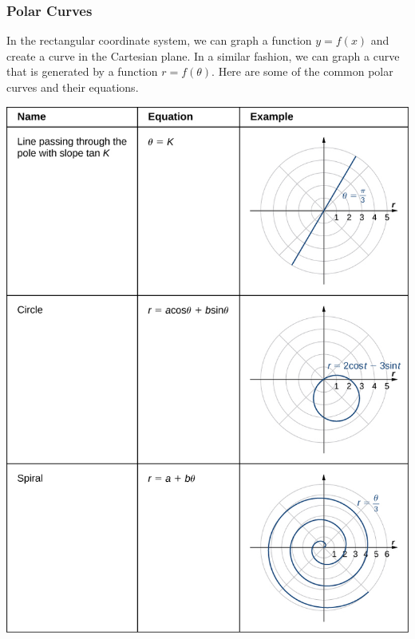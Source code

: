 \documentclass[12pt,addpoints]{exam}
\begin{document}
	\subsubsection*{Polar Curves}
	In the rectangular coordinate system, we can graph a function $y=f(x)$ and create a curve in the Cartesian plane. In a similar fashion, we can graph a curve that is generated by a function  $r=f(\theta)$. Here are some of the common polar curves and their equations.
	\begin{center}
		\includegraphics[scale=1.00]{polar_curves.png}

\end{center}
\end{document}
